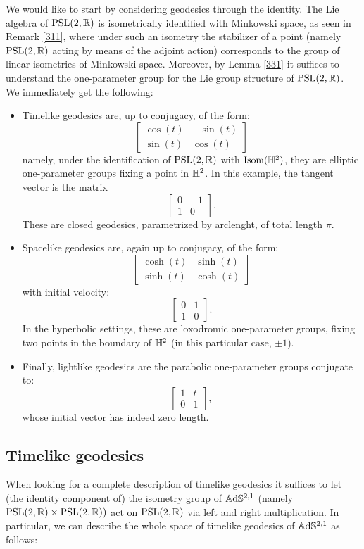 We would like to start by considering geodesics through the identity. The Lie algebra of $\text{PSL}(2,\mathbb{R})$ is isometrically identified with Minkowski space, as seen in Remark \ref{311}, where under such an isometry the stabilizer of a point (namely $\text{PSL}(2,\mathbb{R})$ acting by means of the adjoint action) corresponds to the group of linear isometries of Minkowski space. Moreover, by Lemma \ref{331} it suffices to understand the one-parameter group for the Lie group structure of $\text{PSL}(2,\mathbb{R})$. We immediately get the following:

\begin{itemize}
    \item Timelike geodesics are, up to conjugacy, of the form: 
    \[
    \begin{bmatrix}
    \cos(t) & -\sin(t) \\
    \sin(t) & \cos(t)
     \end{bmatrix}
\]
namely, under the identification of $\text{PSL}(2,\mathbb{R})$ with $\text{Isom}(\mathbb{H}^2)$, they are elliptic one-parameter groups fixing a point in $\mathbb{H}^2$. In this example, the tangent vector is the matrix
\[
    \begin{bmatrix}
    0 & -1 \\
    1 & 0
    \end{bmatrix}.
    \]
These are closed geodesics, parametrized by arclenght, of total length $\pi$. 
\item Spacelike geodesics are, again up to conjugacy, of the form: 
\[
    \begin{bmatrix}
    \cosh(t) & \sinh(t) \\
    \sinh(t) & \cosh(t) \end{bmatrix}
\]
with initial velocity: 
\[
    \begin{bmatrix}
        0 & 1 \\
        1 & 0
    \end{bmatrix}.
\]
In the hyperbolic settings, these are loxodromic one-parameter groups, fixing two points in the boundary of $\mathbb{H}^2$ (in this particular case, $\pm 1$). 
\item Finally, lightlike geodesics are the parabolic one-parameter groups conjugate to: 
\[
    \begin{bmatrix}
        1 & t \\
        0 & 1 
    \end{bmatrix},
\]
whose initial vector has indeed zero length.
\end{itemize}

\subsection{Timelike geodesics}
When looking for a complete description of timelike geodesics it suffices to let (the identity component of) the isometry group of $\mathbb{A}\mathrm{d}\mathbb{S}^{2,1}$ (namely $\text{PSL}(2,\mathbb{R})\times\text{PSL}(2,\mathbb{R}))$ act on $\text{PSL}(2,\mathbb{R})$ via left and right multiplication. In particular, we can describe the whole space of timelike geodesics of $\mathbb{A}\mathrm{d}\mathbb{S}^{2,1}$ as follows: 

